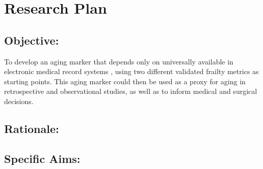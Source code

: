 \section{Research Plan }\label{research-plan}


\subsection{Objective:}\label{objective}
  
To develop an aging marker\cite{Orkaby_2017} that depends only on universally available in electronic medical record systems ,
using two different validated frailty metrics as starting points. This
aging marker could then be used as a proxy for aging in retrospective
and observational studies, as well as to inform medical and surgical
decisions.


\subsection{Rationale:}\label{rationale}

\subsection{Specific Aims:}\label{specific-aims}
